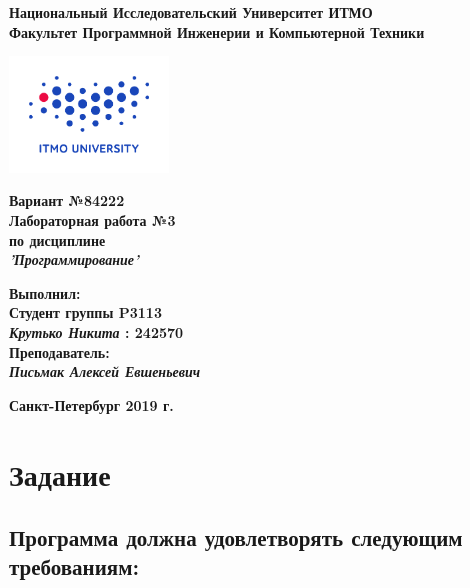 \documentclass[11pt]{article}
\author{Krutko Nikita / KrutNA}
\date{\today}
\title{}
\begin{document}
\large
\thispagestyle{empty}
\begin{center}
\textbf{Национальный Исследовательский Университет ИТМО}\\
\textbf{Факультет Программной Инженерии и Компьютерной Техники}\\
\end{center}
\vspace{2em}
\begin{center}
\includegraphics[width=120pt]{itmo-logo.png}
\end{center}
\LARGE
\vspace{5em}
\begin{center}
\textbf{Вариант №84222}\\
\textbf{Лабораторная работа №3}\\
\Large
\textbf{по дисциплине}\\
\LARGE
\textbf{\emph{'Программирование'}}\\
\end{center}
\vspace{11em}
\large
\begin{flushright}
\textbf{Выполнил:}\\
\textbf{Студент группы P3113}\\
\textbf{\emph{Крутько Никита} : 242570}\\
\textbf{Преподаватель:}\\
\textbf{\emph{Письмак Алексей Евшеньевич}}\\
\end{flushright}
\vspace{4em}
\large
\begin{center}
\textbf{Санкт-Петербург 2019 г.}
\end{center}
\pagebreak{}
\setcounter{tocdepth}{2}
\tableofcontents
\vspace{2em}
\section{Задание}
\label{sec:orgf1ceadc}

\subsection{Программа должна удовлетворять следующим требованиям:}
\label{sec:orgbb66d73}
\end{document}
